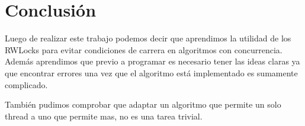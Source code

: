 \section{Conclusión}

Luego de realizar este trabajo podemos decir que aprendimos la utilidad de los RWLocks para evitar condiciones de carrera en algoritmos con concurrencia. 
Además aprendimos que previo a programar es necesario tener las ideas claras ya que encontrar errores una vez que el algoritmo está implementado es sumamente complicado.

También pudimos comprobar que adaptar un algoritmo que permite un solo thread a uno que permite mas, no es una tarea trivial. 